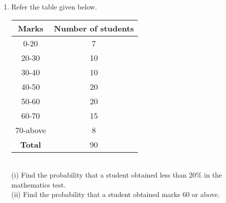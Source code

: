 \renewcommand{\theequation}{\theenumi}
\begin{enumerate}[label=\arabic*.,ref=\thesubsection.\theenumi]
	\item Refer the table given below.\\
	\begin{tabular}{ |c|c| } 
		\hline
		\textbf{Marks} &\textbf{Number of students}\\
		\hline
		0-20 &7\\ 
		20-30 &10\\ 
		30-40 &10\\ 
		40-50 &20\\ 
		50-60 &20\\ 
		60-70 &15\\ 
		70-above &8\\ 
		\hline
		\textbf{Total}  &90\\ 
		\hline
	\end{tabular}\\
	
	(i) Find the probability that a student obtained less than 20$\%$ in the mathematics test.\\
	(ii) Find the probability that a student obtained marks 60 or above.\\
\end{enumerate}

